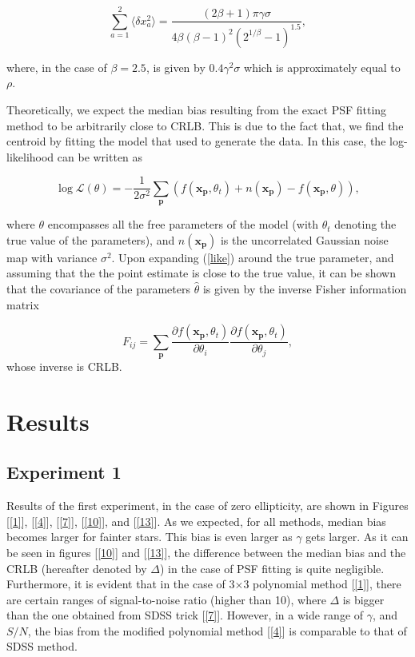 \documentclass[12pt, preprint]{aastex}
\newcommand{\beq}{\begin{equation}}
\newcommand{\eeq}{\end{equation}}
\begin{document}
\beq
\sum_{a=1}^{2} \langle \delta x_{a}^{2} \rangle = \frac{(2\beta + 1)\pi \gamma \sigma}{4 \beta (\beta-1)^{2}(2^{1/\beta}-1)^{1.5}},
\eeq

where, in the case of $\beta = 2.5$, is given by $0.4\gamma^{2}\sigma$ which is approximately equal to $\rho$.

Theoretically, we expect the median bias resulting from the exact PSF fitting method to be arbitrarily close to CRLB. This is due to the fact that, we find the centroid by fitting the model that used to generate the data. In this case, the log-likelihood can be written as

\beq
\log \mathcal{L}(\theta) = -\frac{1}{2\sigma^{2}}\sum_{\mathbf{p}}(f(\mathbf{x}_{\mathbf{p}},\theta_{t})+ n(\mathbf{x}_{\mathbf{p}}) - f(\mathbf{x}_{\mathbf{p}},\theta)),
\label{like}
\eeq  

where $\theta$ encompasses all the free parameters of the model (with $\theta_{t}$ denoting the true value of the parameters), and $n(\mathbf{x}_{\mathbf{p}})$ is the uncorrelated Gaussian noise map with variance $\sigma^{2}$. Upon expanding (\ref{like}) around the true parameter, and assuming that the the point estimate is close to the true value, it can be shown that the covariance of the parameters $\hat{\theta}$ is given by the inverse Fisher information matrix

\beq
F_{ij} = \sum_{\mathbf{p}}\frac{\partial f(\mathbf{x}_{\mathbf{p}},\theta_{t})}{\partial \theta_{i}}\frac{\partial f(\mathbf{x}_{\mathbf{p}},\theta_{t})}{\partial \theta_{j}},
\eeq 
whose inverse is CRLB.


\section{Results}\label{sec:results}

\subsection{Experiment 1}
   
Results of the first experiment, in the case of zero ellipticity, are shown in Figures [\ref{1}], [\ref{4}], [\ref{7}], [\ref{10}], and [\ref{13}]. As we expected, for all methods, median bias becomes larger for fainter stars. This bias is even larger as $\gamma$ gets larger. As it can be seen in figures [\ref{10}] and [\ref{13}], the difference between the median bias and the CRLB (hereafter denoted by $\Delta$) in the case of PSF fitting is quite negligible. Furthermore, it is evident that in the case of 3$\times$3 polynomial method [\ref{1}], there are certain ranges of signal-to-noise ratio (higher than 10), where $\Delta$ is bigger than the one obtained from SDSS trick [\ref{7}]. However, in a wide range of $\gamma$, and $S/N$, the bias from the modified polynomial method [\ref{4}] is comparable to that of SDSS method. 
\end{document}
